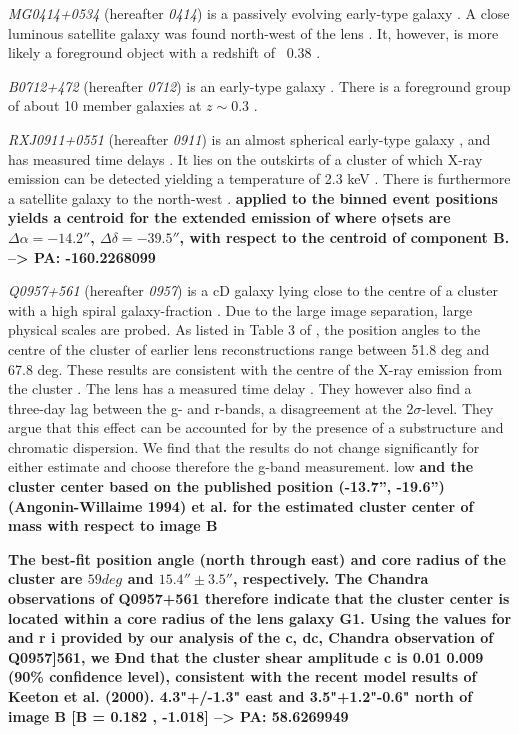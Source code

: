 \documentclass[useAMS,usenatbib]{mn2e}
\begin{document}
\textit{MG0414+0534} (hereafter \textit{0414}) is a passively evolving early-type galaxy \citep{1999AJ....117.2034T}. A close luminous satellite galaxy was found north-west of the lens \citep{1993AJ....105....1S}. It, however, is more likely a foreground object with a redshift of ~0.38 \citep{2011MNRAS.413L..86C}.

\textit{B0712+472} (hereafter \textit{0712}) is an early-type galaxy \citep{1998MNRAS.296..483J,1998AJ....115..377F}. There is a foreground group of about 10 member galaxies at $z\sim0.3$ \citep{2002AJ....123..627F}.

\textit{RXJ0911+0551} (hereafter \textit{0911}) is an almost spherical early-type galaxy \citep{1997A&A...317L..13B,2012A&A...538A..99S}, and has measured time delays \citep{2002ApJ...572L..11H}. It lies on the outskirts of a cluster of which X-ray emission can be detected yielding a temperature of 2.3 keV \citep{2001ApJ...555....1M}. There is furthermore a satellite galaxy to the north-west \citep{2000ApJ...544L..35K}.
\textbf{applied to the binned event positions yields a centroid for the extended emission of where o†sets are $\Delta\alpha = -14.2''$, $\Delta\delta = -39.5''$, with respect to the centroid of component B. --> PA: -160.2268099}

\textit{Q0957+561} (hereafter \textit{0957}) is a cD galaxy lying close to the centre of a cluster with a high spiral galaxy-fraction \citep[e.g.][]{1992MNRAS.254P..27G,1994A&A...291..411A,1998ApJ...504..661C}. Due to the large image separation, large physical scales are probed. As listed in Table 3 of \citet{2000ApJ...542...74K}, the position angles to the centre of the cluster of earlier lens reconstructions range between 51.8 deg and 67.8 deg. These results are consistent with the centre of the X-ray emission from the cluster \citep{2002ApJ...565...96C}. The lens has a measured time delay \citep[e.g.][]{2012A&A...540A.132S}. They however also find a three-day lag between the g- and r-bands, a disagreement at the 2$\sigma$-level. They argue that this effect can be accounted for by the presence of a substructure and chromatic dispersion. We find that the results do not change significantly for either estimate and choose therefore the g-band measurement.
low
\textbf{and the cluster center based on the published position (-13.7'', -19.6'') (Angonin-Willaime 1994) et al. for the estimated cluster center of mass with respect to image B \citep{1994A&A...291..411A}}

\textbf{The best-fit position angle (north through east) and core radius of the cluster are $59 deg$ and $15.4'' \pm 3.5''$, respectively. The Chandra observations of Q0957+561 therefore indicate that the cluster center is located within a core radius of the lens galaxy G1. Using the values for and r i provided by our analysis of the c, dc, Chandra observation of Q0957]561, we Ðnd that the cluster shear amplitude c is 0.01 0.009 (90\% confidence level), consistent with the recent model results of Keeton et al. (2000). 4.3"+/-1.3" east and 3.5"+1.2"-0.6" north of image B [B =  0.182 , -1.018] --> PA: 58.6269949 \citep{2002ApJ...565...96C}}
\end{document}
